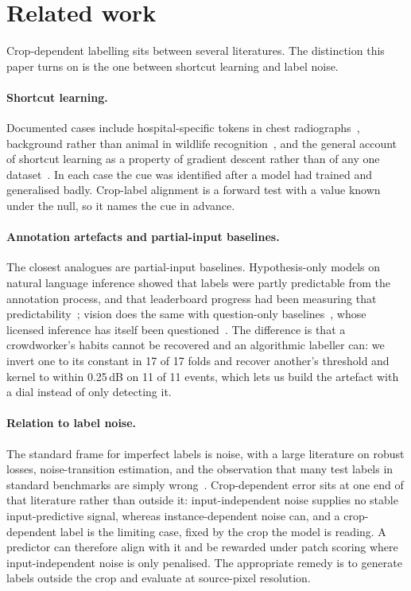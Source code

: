 \section{Related work}
\label{sec:related}

Crop-dependent labelling sits between several literatures. The distinction this paper
turns on is the one between shortcut learning and label noise.

\paragraph{Shortcut learning.} Documented cases include
hospital-specific tokens in chest radiographs~\cite{zech2018variable}, background
rather than animal in wildlife recognition~\cite{beery2018terra}, and the general
account of shortcut learning as a property of gradient descent rather than of any
one dataset~\cite{geirhos2020shortcut, lapuschkin2019unmasking}. In each case the cue
was identified after a model had trained and generalised badly. Crop-label alignment
is a forward test with a value known under the null, so it names the cue in advance.

\paragraph{Annotation artefacts and partial-input baselines.} The closest analogues
are partial-input baselines. Hypothesis-only models on natural language inference
showed that labels were partly predictable from the annotation process, and that
leaderboard progress had been measuring that
predictability~\cite{gururangan2018annotation, poliak2018hypothesis}; vision does the
same with question-only baselines~\cite{goyal2017making, jabri2016revisiting}, whose
licensed inference has itself been questioned~\cite{feng2019misleading}. The
difference is that a crowdworker's habits cannot be recovered and an algorithmic
labeller can: we invert one to its constant in 17 of 17 folds and recover another's
threshold and kernel to within 0.25\,dB on 11 of 11 events, which lets us build the
artefact with a dial instead of only detecting it.

\paragraph{Relation to label noise.} The standard frame for imperfect
labels is noise, with a large literature on robust losses, noise-transition
estimation, and the observation that many test labels in standard benchmarks are
simply wrong~\cite{song2022learning, northcutt2021confident,
northcutt2021pervasive}. Crop-dependent error sits at one end of that literature
rather than outside it: input-independent noise supplies no stable input-predictive
signal, whereas instance-dependent noise can, and a crop-dependent label is the
limiting case, fixed by the crop the model is reading. A predictor can therefore
align with it and be rewarded under patch scoring where input-independent noise is
only penalised. The appropriate remedy is to generate labels outside the crop and
evaluate at source-pixel resolution.

